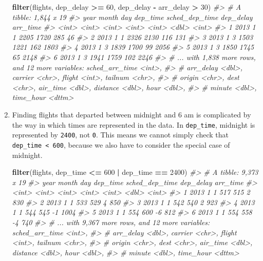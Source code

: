 \documentclass[]{book}
\newenvironment{Shaded}{\begin{snugshade}}{\end{snugshade}}
\newcommand{\CommentTok}[1]{\textcolor[rgb]{0.56,0.35,0.01}{\textit{#1}}}
\newcommand{\DecValTok}[1]{\textcolor[rgb]{0.00,0.00,0.81}{#1}}
\newcommand{\KeywordTok}[1]{\textcolor[rgb]{0.13,0.29,0.53}{\textbf{#1}}}
\newcommand{\NormalTok}[1]{#1}
\newcommand{\OperatorTok}[1]{\textcolor[rgb]{0.81,0.36,0.00}{\textbf{#1}}}
\newcommand{\StringTok}[1]{\textcolor[rgb]{0.31,0.60,0.02}{#1}}
\theoremstyle{plain}
\theoremstyle{remark}
\begin{document}
\begin{enumerate}
\begin{Shaded}
\begin{Highlighting}[]
\KeywordTok{filter}\NormalTok{(flights, dep_delay }\OperatorTok{>=}\StringTok{ }\DecValTok{60}\NormalTok{, dep_delay }\OperatorTok{-}\StringTok{ }\NormalTok{arr_delay }\OperatorTok{>}\StringTok{ }\DecValTok{30}\NormalTok{)}
\CommentTok{#> # A tibble: 1,844 x 19}
\CommentTok{#>    year month   day dep_time sched_dep_time dep_delay arr_time}
\CommentTok{#>   <int> <int> <int>    <int>          <int>     <dbl>    <int>}
\CommentTok{#> 1  2013     1     1     2205           1720       285       46}
\CommentTok{#> 2  2013     1     1     2326           2130       116      131}
\CommentTok{#> 3  2013     1     3     1503           1221       162     1803}
\CommentTok{#> 4  2013     1     3     1839           1700        99     2056}
\CommentTok{#> 5  2013     1     3     1850           1745        65     2148}
\CommentTok{#> 6  2013     1     3     1941           1759       102     2246}
\CommentTok{#> # ... with 1,838 more rows, and 12 more variables: sched_arr_time <int>,}
\CommentTok{#> #   arr_delay <dbl>, carrier <chr>, flight <int>, tailnum <chr>,}
\CommentTok{#> #   origin <chr>, dest <chr>, air_time <dbl>, distance <dbl>, hour <dbl>,}
\CommentTok{#> #   minute <dbl>, time_hour <dttm>}
\end{Highlighting}
\end{Shaded}
\item
  Finding flights that departed between midnight and 6 am is complicated
  by the way in which times are represented in the data. In
  \texttt{dep\_time}, midnight is represented by \texttt{2400}, not
  \texttt{0}. This means we cannot simply check that
  \texttt{dep\_time\ \textless{}\ 600}, because we also have to consider
  the special case of midnight.

\begin{Shaded}
\begin{Highlighting}[]
\KeywordTok{filter}\NormalTok{(flights, dep_time }\OperatorTok{<=}\StringTok{ }\DecValTok{600} \OperatorTok{|}\StringTok{ }\NormalTok{dep_time }\OperatorTok{==}\StringTok{ }\DecValTok{2400}\NormalTok{)}
\CommentTok{#> # A tibble: 9,373 x 19}
\CommentTok{#>    year month   day dep_time sched_dep_time dep_delay arr_time}
\CommentTok{#>   <int> <int> <int>    <int>          <int>     <dbl>    <int>}
\CommentTok{#> 1  2013     1     1      517            515         2      830}
\CommentTok{#> 2  2013     1     1      533            529         4      850}
\CommentTok{#> 3  2013     1     1      542            540         2      923}
\CommentTok{#> 4  2013     1     1      544            545        -1     1004}
\CommentTok{#> 5  2013     1     1      554            600        -6      812}
\CommentTok{#> 6  2013     1     1      554            558        -4      740}
\CommentTok{#> # ... with 9,367 more rows, and 12 more variables: sched_arr_time <int>,}
\CommentTok{#> #   arr_delay <dbl>, carrier <chr>, flight <int>, tailnum <chr>,}
\CommentTok{#> #   origin <chr>, dest <chr>, air_time <dbl>, distance <dbl>, hour <dbl>,}
\CommentTok{#> #   minute <dbl>, time_hour <dttm>}
\end{Highlighting}
\end{Shaded}


\end{enumerate}
\end{document}
